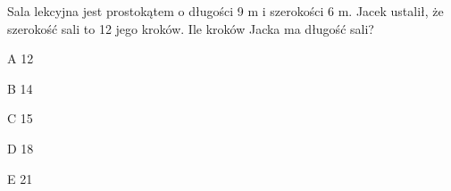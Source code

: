 \begin{tresc}
Sala lekcyjna jest prostokątem o długości 9 m i szerokości 6 m. Jacek ustalił, że szerokość sali to 12 jego kroków. Ile kroków Jacka ma długość sali?
\end{tresc}
\begin{wariant}{A} 12 \end{wariant}
\begin{wariant}{B} 14 \end{wariant}
\begin{wariant}{C} 15 \end{wariant}
\begin{wariant}{D} 18 \end{wariant}
\begin{wariant}{E} 21 \end{wariant}
